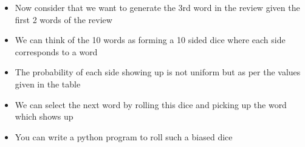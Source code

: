 \begin{frame}[shrink=15		]
\begin{overlayarea}{\textwidth}{\textheight}
\begin{columns}
				\begin{overlayarea}{\textwidth}{\textheight}
					\begin{itemize}\justifying
						\item<1-> Now consider that we want to generate the 3rd word in the review given the first 2 words of the review
						\item<2-> We can think of the 10 words as forming a 10 sided dice where each side corresponds to a word
						\item<3-> The probability of each side showing up is not uniform but as per the values given in the table
						\item<4-> We can select the next word by rolling this dice and picking up the word which shows up
						\item<5-> You can write a python program to roll such a biased dice
					\end{itemize}
					\begin{center}
					\end{center}
				\end{overlayarea}
		\end{columns}
	\end{overlayarea}
\end{frame}

